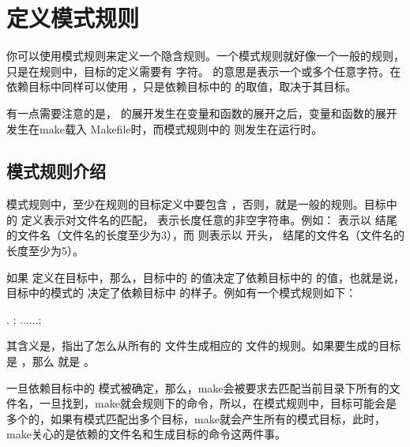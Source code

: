 \documentclass[a4paper,10pt]{sphinxmanual}
\begin{document}
\section{定义模式规则}
\label{\detokenize{implicit_rules:id8}}
你可以使用模式规则来定义一个隐含规则。一个模式规则就好像一个一般的规则，只是在规则中，目标的定义需要有 \sphinxcode{\sphinxupquote{\%}} 字符。 \sphinxcode{\sphinxupquote{\%}} 的意思是表示一个或多个任意字符。在依赖目标中同样可以使用 \sphinxcode{\sphinxupquote{\%}} ，只是依赖目标中的 \sphinxcode{\sphinxupquote{\%}} 的取值，取决于其目标。

有一点需要注意的是， \sphinxcode{\sphinxupquote{\%}} 的展开发生在变量和函数的展开之后，变量和函数的展开发生在make载入
Makefile时，而模式规则中的 \sphinxcode{\sphinxupquote{\%}} 则发生在运行时。


\subsection{模式规则介绍}
\label{\detokenize{implicit_rules:id9}}
模式规则中，至少在规则的目标定义中要包含 \sphinxcode{\sphinxupquote{\%}} ，否则，就是一般的规则。目标中的 \sphinxcode{\sphinxupquote{\%}} 定义表示对文件名的匹配， \sphinxcode{\sphinxupquote{\%}} 表示长度任意的非空字符串。例如：  表示以  结尾的文件名（文件名的长度至少为3），而  则表示以  开头，  结尾的文件名（文件名的长度至少为5）。

如果 \sphinxcode{\sphinxupquote{\%}} 定义在目标中，那么，目标中的 \sphinxcode{\sphinxupquote{\%}} 的值决定了依赖目标中的 \sphinxcode{\sphinxupquote{\%}} 的值，也就是说，目标中的模式的 \sphinxcode{\sphinxupquote{\%}} 决定了依赖目标中 \sphinxcode{\sphinxupquote{\%}} 的样子。例如有一个模式规则如下：

\begin{sphinxVerbatim}[commandchars=\\\{\}]
 \PYGZpc{}. ; \PYGZlt{} ......\PYGZgt{};
\end{sphinxVerbatim}

其含义是，指出了怎么从所有的  文件生成相应的  文件的规则。如果要生成的目标是
 ，那么  就是  。

一旦依赖目标中的 \sphinxcode{\sphinxupquote{\%}} 模式被确定，那么，make会被要求去匹配当前目录下所有的文件名，一旦找到，make就会规则下的命令，所以，在模式规则中，目标可能会是多个的，如果有模式匹配出多个目标，make就会产生所有的模式目标，此时，make关心的是依赖的文件名和生成目标的命令这两件事。
\end{document}
